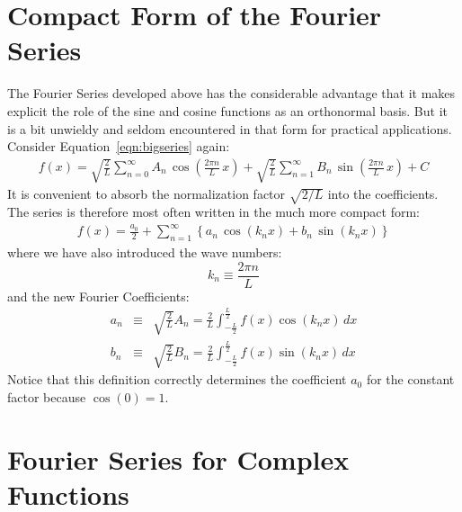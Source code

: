 \documentclass[12pt,oneside]{book}
\begin{document}
\section{Compact Form of the Fourier Series}

The Fourier Series developed above has the considerable advantage that it makes explicit the role of the sine and cosine functions as an orthonormal basis.  But it is a bit unwieldy and seldom encountered in that form for practical applications.  Consider Equation~\ref{eqn:bigseries} again:
\begin{eqnarray*}
f(x) = \sqrt{\frac{2}{L}} \sum_{n=0}^{\infty}  A_n \, \cos\left(\frac{2\pi n}{L} \, x \right) + \sqrt{\frac{2}{L}} \sum_{n=1}^{\infty} B_n \, \sin\left(\frac{2\pi n}{L} \, x \right) + C
\end{eqnarray*}
It is convenient to absorb the normalization factor $\sqrt{2/L}$ into the coefficients.  The series is therefore most often written in the much more compact form:
\begin{eqnarray}
f(x) = \frac{a_0}{2} + \sum_{n=1}^{\infty}  \left\{ a_n \, \cos(k_n x ) + b_n \, \sin( k_n x ) \right\}\label{eqn:convseries}
\end{eqnarray}
where we have also introduced the wave numbers:
\begin{equation}
k_n \equiv \frac{2 \pi n}{L} \label{eqn:kn}
\end{equation}
and the new Fourier Coefficients:
\begin{eqnarray}
a_n &\equiv& \sqrt{\frac{2}{L}}  A_n = \frac{2}{L} \int_{-\frac{L}{2}}^{\frac{L}{2}} 
f(x) \cos( k_n x) \, dx  \label{eqn:convcoeffa}\\
b_n &\equiv& \sqrt{\frac{2}{L}}  B_n = \frac{2}{L} \int_{-\frac{L}{2}}^{\frac{L}{2}} 
f(x) \sin( k_n x) \, dx \label{eqn:convcoeffb}
\end{eqnarray}
Notice that this definition correctly determines the coefficient $a_0$ for the constant factor because $\cos(0) = 1$.

\section{Fourier Series for Complex Functions}
\end{document}
